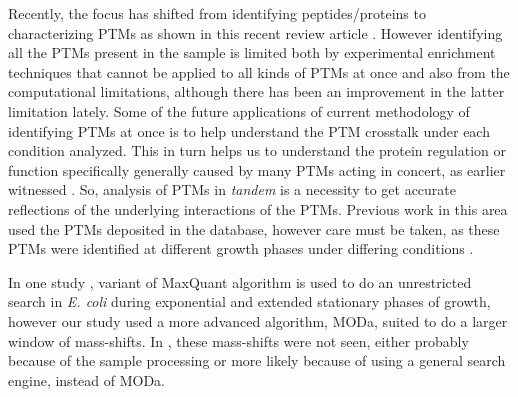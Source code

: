 \documentclass[12pt]{article}
\begin{document}
Recently, the focus has shifted from identifying peptides/proteins to characterizing PTMs as shown in this recent review article \cite{OlsenMann2013}. However identifying all the PTMs present in the sample is limited both by experimental enrichment techniques that cannot be applied to all kinds of PTMs at once and also from the computational limitations, although there has been an improvement in the latter limitation lately. Some of the future applications of current methodology of identifying PTMs at once is to help understand the PTM crosstalk under each condition analyzed. This in turn helps us to understand the protein regulation or function specifically generally caused by many PTMs acting in concert, as earlier witnessed \cite{Pengetal2014}. So, analysis of PTMs in \emph{tandem} is a necessity to get accurate reflections of the underlying interactions of the PTMs. Previous work in this area used the PTMs deposited in the database, however care must be taken, as these PTMs were identified at different growth phases under differing conditions \cite{Pengetal2014}.

In one study \cite{Soufietal2015}, variant of MaxQuant algorithm is used to do an unrestricted search in \emph{E. coli} during exponential and extended stationary phases of growth, however our study used a more advanced algorithm, MODa, suited to do a larger window of mass-shifts. In \cite{Soufietal2015}, these mass-shifts were not seen, either probably because of the sample processing or more likely because of using a general search engine, instead of MODa. 
\end{document}
